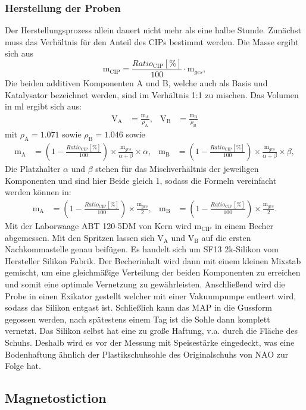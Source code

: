\subsubsection*{Herstellung der Proben}
Der Herstellungsprozess allein dauert nicht mehr als eine halbe Stunde. Zunächst muss das Verhältnis für den Anteil des CIPs bestimmt werden. Die Masse ergibt sich aus
\begin{equation}
\text{m}_{\text{CIP}} = \frac{Ratio_{\text{CIP}} [\%]}{100}\cdot\text{m}_{ges},
\end{equation}
Die beiden additiven Komponenten A und B, welche auch als Basis und Katalysator bezeichnet werden, sind im Verhältnis 1:1 zu mischen. Das Volumen in \unit{ml} ergibt sich aus:
\begin{align}
\text{V}_\text{A} &= \frac{\text{m}_\text{A}}{\rho_\text{A}} ,& 
\text{V}_\text{B} &= \frac{\text{m}_\text{B}}{\rho_\text{B}}
\end{align}
mit $\rho_\text{A} = 1.071$ sowie $\rho_\text{B} = 1.046$ sowie
\begin{align}	
\text{m}_\text{A} &= \left( 1- \frac{Ratio_{\text{CIP}} [\%]}{100}\right)\times
\frac{\text{m}_{ges}}{\alpha + \beta}\times\alpha ,&
\text{m}_\text{B} &= \left( 1- \frac{Ratio_{\text{CIP}} [\%]}{100}\right)\times
\frac{\text{m}_{ges}}{\alpha + \beta}\times\beta,
\end{align}
Die Platzhalter $\alpha$ und $\beta$ stehen für das Mischverhältnis der jeweiligen Komponenten und sind hier Beide gleich 1, sodass die Formeln vereinfacht werden können in:
\begin{align}	
\text{m}_\text{A} &= \left( 1- \frac{Ratio_{\text{CIP}} [\%]}{100}\right)\times
\frac{\text{m}_{ges}}{2} ,&
\text{m}_\text{B} &= \left( 1- \frac{Ratio_{\text{CIP}} [\%]}{100}\right)\times
\frac{\text{m}_{ges}}{2}.
\end{align}
Mit der Laborwaage ABT 120-5DM von Kern wird $\text{m}_\text{CIP}$ in einem Becher abgemessen. Mit den Spritzen lassen sich $\text{V}_\text{A}$ und $\text{V}_\text{B}$ auf die ersten Nachkommastelle genau beifügen. Es handelt sich um SF13 2k-Silikon vom Hersteller Silikon Fabrik. Der Becherinhalt wird dann mit einem kleinen Mixstab gemischt, um eine gleichmäßige Verteilung der beiden Komponenten zu erreichen und somit eine optimale Vernetzung zu gewährleisten. Anschließend wird die Probe in einen Exikator gestellt welcher mit einer Vakuumpumpe entleert wird, sodass das Silikon entgast ist. Schließlich kann das MAP in die Gussform gegossen werden, nach spätestens einem Tag ist die Sohle dann komplett vernetzt. Das Silikon selbst hat eine zu große Haftung, v.a. durch die Fläche des Schuhs. Deshalb wird es vor der Messung mit Speisestärke eingedeckt, was eine Bodenhaftung ähnlich der Plastikschuhsohle des Originalschuhs von NAO zur Folge hat. 

\subsection{Magnetostiction}
	
